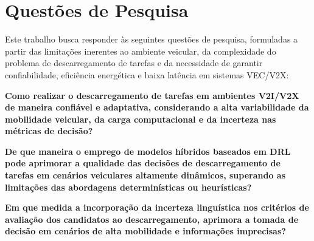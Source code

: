 







\section{Questões de Pesquisa}
\label{sec:questoes-de-pesquisa}

Este trabalho busca responder às seguintes questões de pesquisa, formuladas a partir das limitações inerentes ao ambiente veicular, da complexidade do problema de descarregamento de tarefas e da necessidade de garantir confiabilidade, eficiência energética e baixa latência em sistemas \gls{VEC}/\gls{V2X}:

\begin{alineas}[label=QP\arabic*.]
    \item \textbf{Como realizar o descarregamento de tarefas em ambientes \gls{V2I}/\gls{V2X} de maneira confiável e adaptativa, considerando a alta variabilidade da mobilidade veicular, da carga computacional e da incerteza nas métricas de decisão?}

    \item \textbf{De que maneira o emprego de modelos híbridos baseados em \gls{DRL} pode aprimorar a qualidade das decisões de descarregamento de tarefas em cenários veiculares altamente dinâmicos, superando as limitações das abordagens determinísticas ou heurísticas?}

    \item \textbf{Em que medida a incorporação da incerteza linguística nos critérios de avaliação dos candidatos ao descarregamento, aprimora a tomada de decisão em cenários de alta mobilidade e informações imprecisas?}
\end{alineas}


